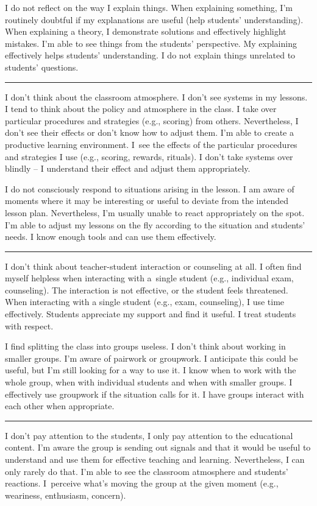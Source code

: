 \newpage
{}
{I do not reflect on the way I explain things.}
{When explaining something, I'm routinely doubtful if my explanations are useful (help students' understanding).}
{When explaining a theory, I demonstrate solutions and effectively highlight mistakes. I'm able to see things from the students' perspective. My explaining effectively helps students' understanding. I do not explain things unrelated to students' questions.}

\rule{\textwidth}{0.4pt}
{I don't think about the classroom atmosphere. I don't see systems in my lessons.}
{I tend to think about the policy and atmosphere in the class. I take over particular procedures and strategies (e.g., scoring) from others. Nevertheless, I don't see their effects or don't know how to adjust them.}
{I'm able to create a productive learning environment. I~see the effects of the particular procedures and strategies I use (e.g., scoring, rewards, rituals). I don't take systems over blindly -- I understand their effect and adjust them appropriately.}

\newpage
{}
{I do not consciously respond to situations arising in the lesson.}
{I am aware of moments where it may be interesting or useful to deviate from the intended lesson plan. Nevertheless, I'm usually unable to react appropriately on the spot.}
{I'm able to adjust my lessons on the fly according to the situation and students' needs. I know enough tools and can use them effectively.}

\rule{\textwidth}{0.4pt}
{I don't think about teacher-student interaction or counseling at all.}
{I often find myself helpless when interacting with a~single student (e.g., individual exam, counseling). The interaction is not effective, or the student feels threatened.}
{When interacting with a single student (e.g., exam, counseling), I use time effectively. Students appreciate my support and find it useful. I treat students with respect. }

\newpage
{}
{I find splitting the class into groups useless. I don't think about working in smaller groups.}
{I'm aware of pairwork or groupwork. I anticipate this could be useful, but I'm still looking for a way to use it.}
{I know when to work with the whole group, when with individual students and when with smaller groups. I effectively use groupwork if the situation calls for it. I have groups interact with each other when appropriate.}

\rule{\textwidth}{0.4pt}
{I don't pay attention to the students, I only pay attention to the educational content.}
{I'm aware the group is sending out signals and that it would be useful to understand and use them for effective teaching and learning. Nevertheless, I can only rarely do that.}
{I'm able to see the classroom atmosphere and students' reactions. I~perceive what's moving the group at the given moment (e.g., weariness, enthusiasm, concern).}
